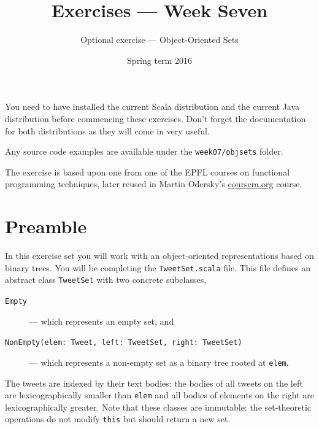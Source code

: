 \documentclass[a4paper,12pt]{exam}
\title{Exercises --- Week Seven}
\date{Spring term 2016}
\author{Optional exercise --- Object-Oriented Sets}
\begin{document}
\maketitle

You need to have installed the current Scala distribution and the current Java distribution
before commencing these exercises.
Don't forget the documentation for both distributions as they will come in very useful.

Any source code examples are available under the \verb!week07/objsets! folder.

The exercise is based upon one from one of the EPFL courses on functional programming techniques, 
later reused in Martin Odersky's \url{coursera.org} course.

\section*{Preamble}

In this exercise set you will work with an object-oriented representations based on binary trees.
You will be  completing the \verb!TweetSet.scala! file. 
This file defines an abstract class \verb!TweetSet! with two concrete subclasses, 
\begin{description}
\item[\texttt{Empty}] --- which represents an empty set, and 
\item[\texttt{NonEmpty(elem: Tweet, left: TweetSet, right: TweetSet)}] 
--- which represents a non-empty set as a binary tree rooted at \verb!elem!. 
\end{description}
The tweets are indexed by their text bodies: the bodies of all tweets on the left 
are lexicographically smaller than \verb!elem! and all bodies of elements on the right 
are lexicographically greater. Note that these classes are immutable: 
the set-theoretic operations do not modify \verb!this! but should return a new set.
\end{document}
